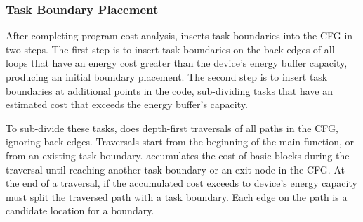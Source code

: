 

\subsubsection{Task Boundary Placement}
\label{sec:compiler_boundary}

After completing program cost analysis, \sys inserts task boundaries into the CFG in two steps. The first step is to insert task boundaries on the back-edges of all loops that have an energy cost greater than the device's energy buffer capacity, producing an initial boundary placement. The second step is to insert task boundaries at additional points in the code, sub-dividing tasks that have an estimated cost that exceeds the energy buffer's capacity.

To sub-divide these tasks, \sys does depth-first traversals of all paths in the CFG, ignoring back-edges. Traversals start from the beginning of the main function, or from an existing task boundary. \sys accumulates the cost of basic blocks during the traversal until reaching another task boundary or an exit node in the CFG. At the end of a traversal, if the accumulated cost exceeds to device's energy capacity \sys must split the traversed path with a task boundary. Each edge on the path is a candidate location for a boundary.

